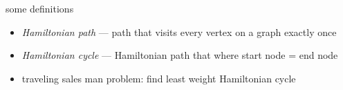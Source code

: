\begin{frame}{some definitions}
\begin{itemize}
\item \textit{Hamiltonian path} --- path that visits every vertex on a graph exactly once
\item \textit{Hamiltonian cycle} --- Hamiltonian path that where start node = end node
\vspace{.5cm}
\item traveling sales man problem: find least weight Hamiltonian cycle
\end{itemize}

\end{frame}
